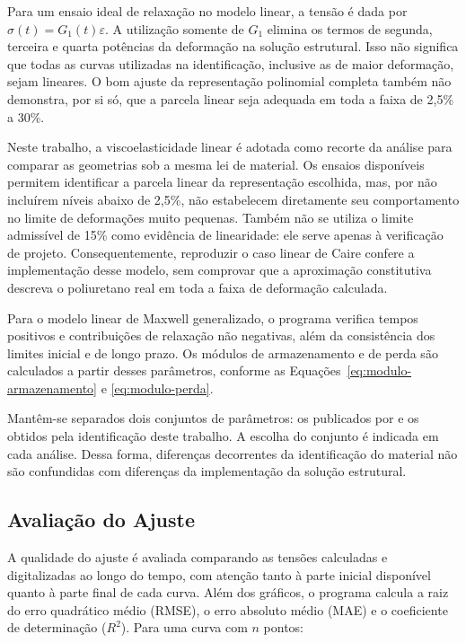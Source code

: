\documentclass[arial,centeredequations,english,brazilian,oneside,section=TITLE]{ifes8}
\begin{document}
Para um ensaio ideal de relaxação no modelo linear, a tensão é dada por
$\sigma(t)=G_1(t)\varepsilon$. A utilização somente de $G_1$ elimina os termos de segunda,
terceira e quarta potências da deformação na solução estrutural. Isso não significa que
todas as curvas utilizadas na identificação, inclusive as de maior deformação, sejam
lineares. O bom ajuste da representação polinomial completa também não demonstra, por
si só, que a parcela linear seja adequada em toda a faixa de 2,5\% a 30\%.

Neste trabalho, a viscoelasticidade linear é adotada como recorte da análise para
comparar as geometrias sob a mesma lei de material. Os ensaios disponíveis permitem
identificar a parcela linear da representação escolhida, mas, por não incluírem
níveis abaixo de 2,5\%, não estabelecem diretamente seu comportamento no limite
de deformações muito pequenas. Também não se utiliza o limite admissível de 15\%
como evidência de linearidade: ele serve apenas à verificação de projeto.
Consequentemente, reproduzir o caso linear de Caire confere a implementação
desse modelo, sem comprovar que a aproximação constitutiva descreva o poliuretano
real em toda a faixa de deformação calculada.

Para o modelo linear de Maxwell generalizado, o programa verifica
tempos positivos e contribuições de relaxação não negativas, além da consistência dos
limites inicial e de longo prazo. Os módulos de armazenamento e de perda são calculados
a partir desses parâmetros, conforme as Equações~\eqref{eq:modulo-armazenamento} e
\eqref{eq:modulo-perda}.

Mantêm-se separados dois conjuntos de parâmetros: os publicados por
 e os obtidos pela identificação deste trabalho. A escolha do conjunto
é indicada em cada análise. Dessa forma, diferenças decorrentes da identificação do material
não são confundidas com diferenças da implementação da solução estrutural.

\subsection{Avaliação do Ajuste}
\label{sec:avaliacao-ajuste-material}

A qualidade do ajuste é avaliada comparando as tensões calculadas e digitalizadas ao longo
do tempo, com atenção tanto à parte inicial disponível quanto à parte final de cada curva.
Além dos gráficos, o programa calcula a raiz do erro quadrático médio (RMSE), o erro absoluto
médio (MAE) e o coeficiente de determinação ($R^2$). Para uma curva com $n$ pontos:
\end{document}
